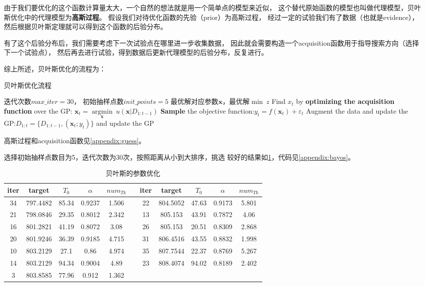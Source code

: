 \documentclass{nudt}
\begin{document}
由于我们要优化的这个函数计算量太大，一个自然的想法就是用一个简单点的模型来近似，
这个替代原始函数的模型也叫做代理模型，贝叶斯优化中的代理模型为\textbf{高斯过程}。
假设我们对待优化函数的先验（prior）为高斯过程，
经过一定的试验我们有了数据（也就是evidence），
然后根据贝叶斯定理就可以得到这个函数的后验分布。

有了这个后验分布后，我们需要考虑下一次试验点在哪里进一步收集数据，
因此就会需要构造一个acquisition函数用于指导搜索方向（选择下一个试验点），
然后再去进行试验，得到数据后更新代理模型的后验分布，反复进行。

综上所述，贝叶斯优化的流程为：
\begin{algorithm}[H]
	\caption{贝叶斯优化流程}  
	\label{alg:Bayes Opt}
	\begin{algorithmic}[1] %
		\Require 迭代次数$max\_iter=30$， 初始抽样点数$init\_points=5$
		\Ensure 最优解对应参数$\mathbf{x}$，最优解$\min\ z $
					\State Find $x_{t}$ by \textbf{optimizing the acquisition function} over the GP:
					$\mathbf{x}_t = \mathop{\arg\min}\limits_{\mathbf{x}}\ u(\mathbf{x}|D_{1:t-1})$
					\State \textbf{Sample} the objective function:$y_t = f(\mathbf{x}_t)+\varepsilon_t$ 
					\State Augment the data and update the GP:$D_{1:t} = \{ D_{1:t-1},(\mathbf{x}_t;y_t) \}$ and update the GP
				\EndFor 
		\EndProcedure  
	\end{algorithmic}  
\end{algorithm} 
高斯过程和acquisition函数见\ref{appendix:guess}。

选择初始抽样点数目为5，迭代次数为30次，按照距离从小到大排序，挑选
较好的结果如\cref{tab:Bayes}，代码见\ref{appendix:bayos}。
\begin{table}[htbp]
	\centering
	\caption{贝叶斯的参数优化}
	  \begin{tabular}{ccccccccccc}
	  \toprule
	  iter & target & $T_{0}$ & $\alpha$ & $num_{Tk}$ &     & iter & target & $T_{0}$ & $\alpha$ & $num_{Tk}$ \\
	  \midrule
	  34  & 797.4482 & 85.34 & 0.9237 & 1.506 &     & 22  & 804.5052 & 47.63 & 0.9173 & 5.801 \\
	  21  & 798.0846 & 29.35 & 0.8012 & 2.342 &     & 13  & 805.153 & 43.91 & 0.7872 & 4.06 \\
	  16  & 801.2821 & 41.19 & 0.8072 & 3.08 &     & 26  & 805.153 & 20.51 & 0.8309 & 2.868 \\
	  20  & 801.9246 & 36.39 & 0.9185 & 4.715 &     & 31  & 806.4516 & 43.55 & 0.8832 & 1.998 \\
	  10  & 803.2129 & 27.1 & 0.86 & 4.974 &     & 35  & 807.7544 & 22.37 & 0.8769 & 5.267 \\
	  14  & 803.2129 & 94.34 & 0.9004 & 4.89 &     & 23  & 808.4074 & 94.02 & 0.8189 & 2.402 \\
	  3   & 803.8585 & 77.96 & 0.912 & 1.362 &     &     &     &     &     &  \\
	  \bottomrule
	  \end{tabular}%
	\label{tab:Bayes}%
  \end{table}%
\end{document}
